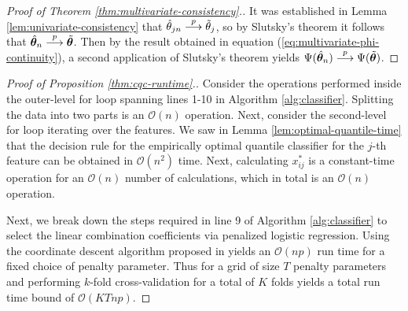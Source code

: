 \begin{proof}[Proof of Theorem \ref{thm:multivariate-consistency}.]
  It was established in Lemma \ref{lem:univariate-consistency} that
  $\hat{\theta}_{jn} \stackrel{p}{\longrightarrow} \tilde{\theta}_j$, so by Slutsky's theorem
  it follows that $\hat{\bm{\theta}}_n \stackrel{p}{\longrightarrow} \tilde{\bm{\theta}}$.
  Then by the result obtained in equation
  (\ref{eq:multivariate-phi-continuity}), a second application of Slutsky's
  theorem yields
  $\Psi(\hat{\bm{\theta}}_n) \stackrel{p}{\longrightarrow} \Psi(\tilde{\bm{\theta}})$.
\end{proof}

\begin{proof}[Proof of Proposition \ref{thm:cqc-runtime}.]
  Consider the operations performed inside the outer-level for loop spanning
  lines 1-10 in Algorithm \ref{alg:classifier}.  Splitting the data into two
  parts is an $\mathcal{O}(n)$ operation.  Next, consider the second-level for
  loop iterating over the features.  We saw in Lemma
  \ref{lem:optimal-quantile-time} that the decision rule for the empirically
  optimal quantile classifier for the $j$-th feature can be obtained in
  $\mathcal{O}(n^2)$ time.  Next, calculating $x_{ij}^{*}$ is a constant-time
  operation for an $\mathcal{O}(n)$ number of calculations, which in total is an
  $\mathcal{O}(n)$ operation.

  Next, we break down the steps required in line 9 of Algorithm
  \ref{alg:classifier} to select the linear combination coefficients via
  penalized logistic regression.  Using the coordinate descent algorithm
  proposed in \cite{friedman2007, friedman2010} yields an $\mathcal{O}(np)$ run
  time for a fixed choice of penalty parameter.  Thus for a grid of size $T$
  penalty parameters and performing $k$-fold cross-validation for a total of $K$
  folds yields a total run time bound of $\mathcal{O}(KTnp)$.


\end{proof}

